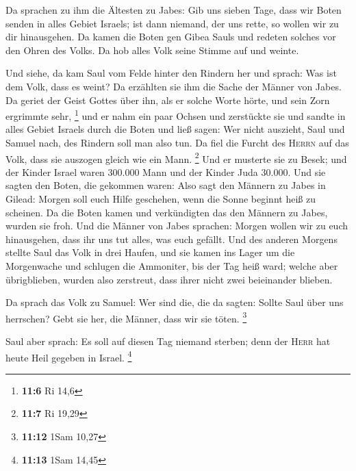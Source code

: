  Da sprachen zu ihm die Ältesten zu Jabes: Gib uns sieben
Tage, dass wir Boten senden in alles Gebiet Israels; ist dann niemand,
der uns rette, so wollen wir zu dir hinausgehen.  Da kamen
die Boten gen Gibea Sauls und redeten solches vor den Ohren des Volks.
Da hob alles Volk seine Stimme auf und weinte.

 Und siehe, da kam Saul vom Felde hinter den Rindern her
und sprach: Was ist dem Volk, dass es weint? Da erzählten sie ihm die
Sache der Männer von Jabes.  Da geriet der Geist Gottes
über ihn, als er solche Worte hörte, und sein Zorn ergrimmte sehr,
\footnote{\textbf{11:6} Ri 14,6}  und er nahm ein paar
Ochsen und zerstückte sie und sandte in alles Gebiet Israels durch die
Boten und ließ sagen: Wer nicht auszieht, Saul und Samuel nach, des
Rindern soll man also tun. Da fiel die Furcht des \textsc{Herrn} auf das
Volk, dass sie auszogen gleich wie ein Mann. \footnote{\textbf{11:7} Ri
  19,29}  Und er musterte sie zu Besek; und der Kinder
Israel waren 300.000 Mann und der Kinder Juda 30.000.  Und
sie sagten den Boten, die gekommen waren: Also sagt den Männern zu Jabes
in Gilead: Morgen soll euch Hilfe geschehen, wenn die Sonne beginnt heiß
zu scheinen. Da die Boten kamen und verkündigten das den Männern zu
Jabes, wurden sie froh.  Und die Männer von Jabes
sprachen: Morgen wollen wir zu euch hinausgehen, dass ihr uns tut alles,
was euch gefällt.  Und des anderen Morgens stellte Saul
das Volk in drei Haufen, und sie kamen ins Lager um die Morgenwache und
schlugen die Ammoniter, bis der Tag heiß ward; welche aber übrigblieben,
wurden also zerstreut, dass ihrer nicht zwei beieinander blieben.

 Da sprach das Volk zu Samuel: Wer sind die, die da
sagten: Sollte Saul über uns herrschen? Gebt sie her, die Männer, dass
wir sie töten. \footnote{\textbf{11:12} 1Sam 10,27}

 Saul aber sprach: Es soll auf diesen Tag niemand
sterben; denn der \textsc{Herr} hat heute Heil gegeben in Israel.
\footnote{\textbf{11:13} 1Sam 14,45}

